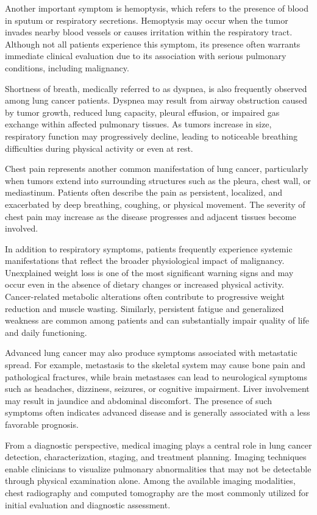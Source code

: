 Another important symptom is hemoptysis, which refers to the presence of blood in sputum or respiratory secretions. Hemoptysis may occur when the tumor invades nearby blood vessels or causes irritation within the respiratory tract. Although not all patients experience this symptom, its presence often warrants immediate clinical evaluation due to its association with serious pulmonary conditions, including malignancy.

Shortness of breath, medically referred to as dyspnea, is also frequently observed among lung cancer patients. Dyspnea may result from airway obstruction caused by tumor growth, reduced lung capacity, pleural effusion, or impaired gas exchange within affected pulmonary tissues. As tumors increase in size, respiratory function may progressively decline, leading to noticeable breathing difficulties during physical activity or even at rest.

Chest pain represents another common manifestation of lung cancer, particularly when tumors extend into surrounding structures such as the pleura, chest wall, or mediastinum. Patients often describe the pain as persistent, localized, and exacerbated by deep breathing, coughing, or physical movement. The severity of chest pain may increase as the disease progresses and adjacent tissues become involved.

In addition to respiratory symptoms, patients frequently experience systemic manifestations that reflect the broader physiological impact of malignancy. Unexplained weight loss is one of the most significant warning signs and may occur even in the absence of dietary changes or increased physical activity. Cancer-related metabolic alterations often contribute to progressive weight reduction and muscle wasting. Similarly, persistent fatigue and generalized weakness are common among patients and can substantially impair quality of life and daily functioning.

Advanced lung cancer may also produce symptoms associated with metastatic spread. For example, metastasis to the skeletal system may cause bone pain and pathological fractures, while brain metastases can lead to neurological symptoms such as headaches, dizziness, seizures, or cognitive impairment. Liver involvement may result in jaundice and abdominal discomfort. The presence of such symptoms often indicates advanced disease and is generally associated with a less favorable prognosis.

From a diagnostic perspective, medical imaging plays a central role in lung cancer detection, characterization, staging, and treatment planning. Imaging techniques enable clinicians to visualize pulmonary abnormalities that may not be detectable through physical examination alone. Among the available imaging modalities, chest radiography and computed tomography are the most commonly utilized for initial evaluation and diagnostic assessment.

